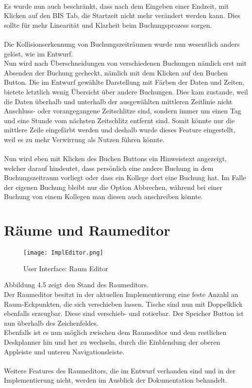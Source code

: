 \paragraph{}
Es wurde nun auch beschränkt, dass nach dem Eingeben einer Endzeit, mit Klicken auf den BIS Tab, die Startzeit nicht mehr verändert werden kann.
Dies sollte für mehr Linearität und Klarheit beim Buchungsprozess sorgen.

\paragraph{}
Die Kollisionserkennung von Buchungszeiträumen wurde nun wesentlich anders gelöst, wie im Entwurf.
\\
Nun wird nach Überschneidungen von verschiedenen Buchungen nämlich erst mit Absenden der Buchung gecheckt, nämlich mit dem Klicken auf den Buchen Button.
Die im Entwurf gewählte Darstellung mit Färben der Daten und Zeiten, bietete letztlich wenig Übersicht über andere Buchungen.
Dies kam zustande, weil die Daten überhalb und unterhalb der ausgewählten mittleren Zeitlinie nicht Anschluss- oder vorangegangene Zeitschlitze sind,
sondern immer um einen Tag und eine Stunde vom nächsten Zeitschlitz entfernt sind. 
Somit könnte nur die mittlere Zeile eingefärbt werden und deshalb wurde dieses Feature eingestellt, weil es zu mehr Verwirrung als Nutzen führen könnte.
\paragraph{}
Nun wird eben mit Klicken des Buchen Buttons ein Hinweistext angezeigt, welcher darauf hindeutet, dass persönlich eine andere Buchung in dem Buchungszeitraum vorliegt oder dass ein Kollege dort eine Buchung hat.
Im Falle der eigenen Buchung bleibt nur die Option Abbrechen, während bei einer Buchung von einem Kollegen man diesen auch anschreiben könnte.

\newpage
\section{Räume und Raumeditor}

\begin{figure}[!h]
  \centering
  \texttt{[image: ImplEditor.png]}
  \caption{User Interface: Raum Editor}
  \label{fig:UI_Editor}
\end{figure}

Abbildung 4.5 zeigt den Stand des Raumeditors. 
\\
Der Raumeditor besitzt in der aktuellen Implementierung eine feste Anzahl an Raum-Eckpunkten, die sich verschieben lassen.
Tische sind nun mit Doppelklick ebenfalls erzeugbar. Diese sind verschieb- und rotierbar. 
Der Speicher Button ist nun überhalb des Zeichenfeldes. 
\\
Ebenfalls ist es nun möglich zwischen dem Raumeditor und dem restlichen Deskplanner hin und her zu wechseln, durch die Einblendung der oberen Appleiste und unteren Navigationsleiste.
\\\\
Weitere Features des Raumeditors, die im Entwurf verhanden sind und in der Implementierung nicht, werden im Ausblick der Dokumentation behandelt.



